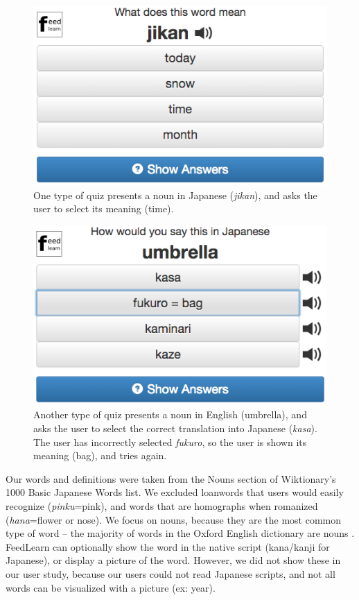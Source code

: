 \documentclass{chi-ext}
\begin{document}
\begin{figure}
\centering
\includegraphics[width=1.0\columnwidth]{quiz1}
\caption{One type of quiz presents a noun in Japanese (\textit{jikan}), and asks the user to select its meaning (time).}
\label{fig:quiz1}
\end{figure}

\begin{figure}
\centering
\includegraphics[width=1.0\columnwidth]{quiz2}
\caption{Another type of quiz presents a noun in English (umbrella), and asks the user to select the correct translation into Japanese (\textit{kasa}). The user has incorrectly selected \textit{fukuro}, so the user is shown its meaning (bag), and tries again.}
\label{fig:quiz2}
\end{figure}

Our words and definitions were taken from the Nouns section of Wiktionary's 1000 Basic Japanese Words list. We excluded loanwords that users would easily recognize (\textit{pinku}=pink), and words that are homographs when romanized (\textit{hana}=flower or nose). We focus on nouns, because they are the most common type of word -- the majority of words in the Oxford English dictionary are nouns \cite{microlearning}. FeedLearn can optionally show the word in the native script (kana/kanji for Japanese), or display a picture of the word. However, we did not show these in our user study, because our users could not read Japanese scripts, and not all words can be visualized with a picture (ex: year).
\end{document}
